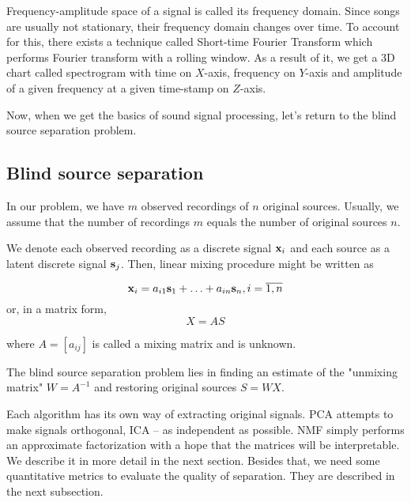 \documentclass[../main.tex]{subfiles} %
\begin{document}
Frequency-amplitude space of a signal is called its frequency domain.
Since songs are usually not stationary, their frequency domain changes over time. 
To account for this, there exists a technique called Short-time Fourier Transform \cite{stft} which performs Fourier transform with a rolling window. 
As a result of it, we get a 3D chart called spectrogram with time on $X$-axis, frequency on $Y$-axis and amplitude of a given frequency at a given time-stamp on $Z$-axis.

Now, when we get the basics of sound signal processing, let's return to the blind source separation problem.

\subsection{Blind source separation}

In our problem, we have $m$ observed recordings of $n$ original sources. Usually, we assume that the number of recordings $m$ equals the number of original sources $n$.

We denote each observed recording as a discrete signal ${\mathbf x}_i$ and each source as a latent discrete signal ${\mathbf s}_j$. Then, linear mixing procedure might be written as

\[{\mathbf x}_i = a_{i1} {\mathbf s}_1 + \ldots + a_{in} {\mathbf s}_n, i = \overline{1, n}\]
or, in a matrix form,
\[X = A S\]

where $A = \left[a_{ij} \right]$ is called a mixing matrix and is unknown. 

The blind source separation problem lies in finding an estimate of the "unmixing matrix" $W = A^{-1}$  and restoring original sources $S = W X$. 

Each algorithm has its own way of extracting original signals. PCA attempts to make signals orthogonal, ICA -- as independent as possible. NMF simply performs an approximate factorization with a hope that the matrices will be interpretable. We describe it in more detail in the next section. 
Besides that, we need some quantitative metrics to evaluate the quality of separation. They are described in the next subsection.
\end{document}
